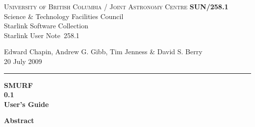 \documentclass[twoside,11pt]{article}
\newcommand{\stardoccategory}  {Starlink User Note}
\newcommand{\stardocinitials}  {SUN}
\newcommand{\stardocnumber}    {258.1}
\newcommand{\stardocauthors}   {Edward Chapin, Andrew G. Gibb, Tim Jenness \& David S. Berry}
\newcommand{\stardocdate}      {20 July 2009}
\newcommand{\stardoctitle}     {SMURF}
\newcommand{\stardocversion}   {0.1}
\newcommand{\stardocmanual}    {User's Guide}
\newcommand{\stardocname}{\stardocinitials /\stardocnumber}
\newenvironment{latexonly}{}{}
\renewcommand{\_}{\texttt{\symbol{95}}}
\begin{document}
\thispagestyle{empty}

\begin{latexonly}
   \textsc{University of British Columbia} / \textsc{Joint Astronomy Centre} \hfill \textbf{\stardocname}\\
   {\large Science \& Technology Facilities Council}\\
   {\large Starlink Software Collection\\}
   {\large \stardoccategory\ \stardocnumber}
   \begin{flushright}
   \stardocauthors\\
   \stardocdate
   \end{flushright}
   \vspace{-4mm}
   \rule{\textwidth}{0.5mm}
   \vspace{5mm}
   \begin{center}
   {\Huge\textbf{\stardoctitle \\ [2.5ex]}}
   {\LARGE\textbf{\stardocversion \\ [4ex]}}
   {\Huge\textbf{\stardocmanual}}
   \end{center}
   \vspace{5mm}


   \vspace{10mm}
   \begin{center}
      {\Large\textbf{Abstract}}
   \end{center}
\end{latexonly}
\end{document}
